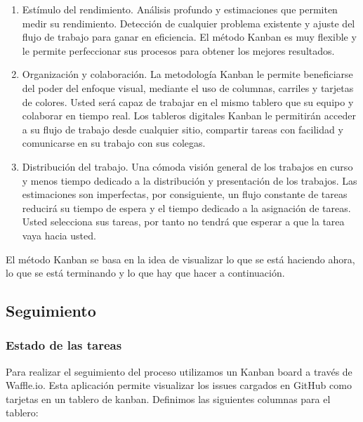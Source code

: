 \documentclass[a4paper,11pt]{article}
\begin{document}
\begin{enumerate}
  \item Estímulo del rendimiento. Análisis profundo y estimaciones que permiten medir su rendimiento. Detección de cualquier problema existente y ajuste del flujo de trabajo para ganar en eficiencia. El método Kanban es muy flexible y le permite perfeccionar sus procesos para obtener los mejores resultados.

  \item Organización y colaboración. La metodología Kanban le permite beneficiarse del poder del enfoque visual, mediante el uso de columnas, carriles y tarjetas de colores. Usted será capaz de trabajar en el mismo tablero que su equipo y colaborar en tiempo real. Los tableros digitales Kanban le permitirán acceder a su flujo de trabajo desde cualquier sitio, compartir tareas con facilidad y comunicarse en su trabajo con sus colegas.

  \item Distribución del trabajo. Una cómoda visión general de los trabajos en curso y menos tiempo dedicado a la distribución y presentación de los trabajos. Las estimaciones son imperfectas, por consiguiente, un flujo constante de tareas reducirá su tiempo de espera y el tiempo dedicado a la asignación de tareas. Usted selecciona sus tareas, por tanto no tendrá que esperar a que la tarea vaya hacia usted.
\end{enumerate}

El método Kanban se basa en la idea de visualizar lo que se está haciendo ahora, lo que se está terminando y lo que hay que hacer a continuación.

\subsection{Seguimiento}

\subsubsection{Estado de las tareas}

Para realizar el seguimiento del proceso utilizamos un Kanban board a través de Waffle.io\cite{waffle}. Esta aplicación permite visualizar los issues cargados en GitHub como tarjetas en un tablero de kanban. Definimos las siguientes columnas para el tablero:
\end{document}
